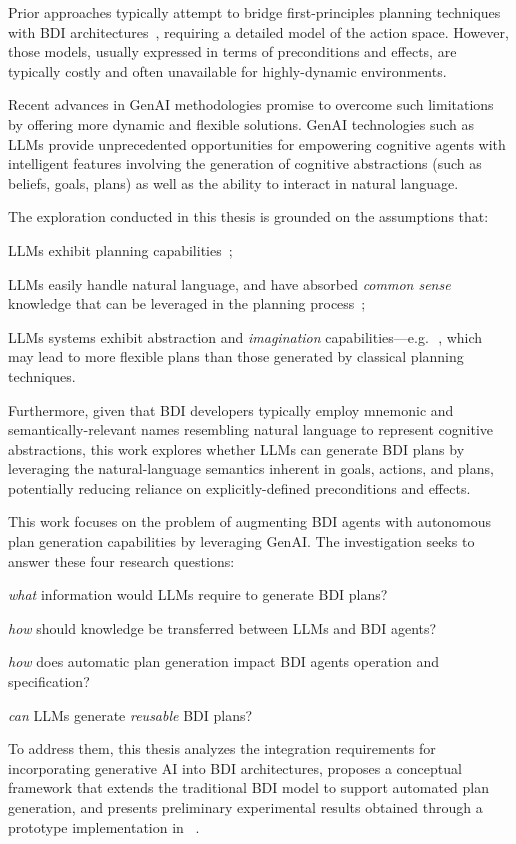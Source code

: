 \documentclass[12pt,a4paper,openright,twoside]{book}
\begin{document}
Prior approaches typically attempt to bridge first-principles planning techniques with \ac{BDI} architectures~\cite{SilvaSP09}, requiring a detailed model of the action space.
%
However, those models, usually expressed in terms of preconditions and effects, are typically costly and often unavailable for highly-dynamic environments.

Recent advances in \ac{GenAI} methodologies promise to overcome such limitations by offering more dynamic and flexible solutions.
%
\ac{GenAI} technologies such as \acp{LLM} provide unprecedented opportunities for empowering cognitive agents with intelligent features involving the generation of cognitive abstractions (such as beliefs, goals, plans) as well as the ability to interact in natural language.

The exploration conducted in this thesis is grounded on the assumptions that:
%
\begin{inlinelist}
    \item \acp{LLM} exhibit planning capabilities~\cite{HuangLWCWL24};
    \item \acp{LLM} easily handle natural language, and have absorbed \emph{common sense} knowledge that can be leveraged in the planning process~\cite{llmoracles-kbs310};
    \item \acp{LLM} systems exhibit abstraction and \emph{imagination} capabilities---e.g.\,~\cite{AregbedeAPLL24}, which may lead to more flexible plans than those generated by classical planning techniques.
\end{inlinelist}
%
Furthermore, given that \ac{BDI} developers typically employ mnemonic and semantically-relevant names resembling natural language to represent cognitive abstractions, this work explores whether \acp{LLM} can generate \ac{BDI} plans by leveraging the natural-language semantics inherent in goals, actions, and plans, potentially reducing reliance on explicitly-defined preconditions and effects.

This work focuses on the problem of augmenting \ac{BDI} agents with autonomous plan generation capabilities by leveraging \ac{GenAI}. The investigation seeks to answer these four research questions:
%
\begin{enumerate*}[label=\textbf{(RQ\arabic*)}]
    \item\label{rq:required-info} \emph{what} information would \acp{LLM} require to generate \ac{BDI} plans?
    \item\label{rq:knowledge-transfer} \emph{how} should knowledge be transferred between \acp{LLM} and \ac{BDI} agents?
    \item\label{rq:agent-spec} \emph{how} does automatic plan generation impact \ac{BDI} agents operation and specification?
    \item\label{rq:reusability} \emph{can} \acp{LLM} generate \emph{reusable} \ac{BDI} plans?
\end{enumerate*}
%
To address them, this thesis analyzes the integration requirements for incorporating generative AI into \ac{BDI} architectures, proposes a conceptual framework that extends the traditional \ac{BDI} model to support automated plan generation, and presents preliminary experimental results obtained through a prototype implementation in \jakta{}~\cite{JaktaSNCS2024}.
\end{document}
